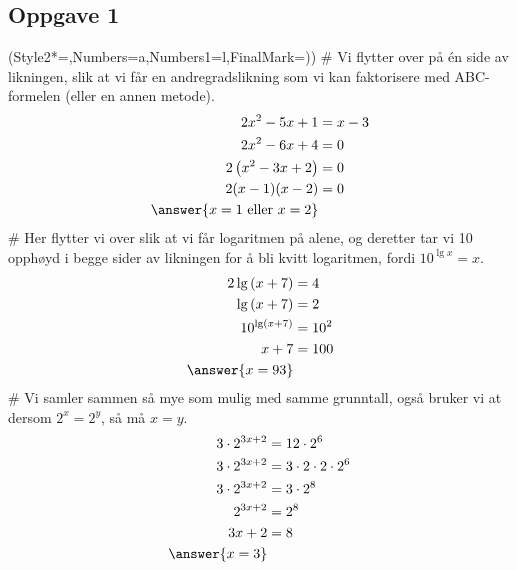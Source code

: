 \subsection*{Oppgave 1}
\begin{easylist}[enumerate]
\ListProperties(Style2*=,Numbers=a,Numbers1=l,FinalMark={)})
# Vi flytter over på én side av likningen, slik at vi får en andregradslikning som vi kan faktorisere med ABC-formelen (eller en annen metode).
\begin{align*}
	2x^2 - 5x + 1 &= x - 3 \\
	2x^2 - 6x + 4 &= 0 \\
	2 \left( x^2 - 3x + 2 \right) &= 0 \\
	2 (x-1)(x-2) &= 0 \\
	\answer{x = 1 \text{ eller } x = 2} &	
\end{align*}
# Her flytter vi over slik at vi får logaritmen på alene, og deretter tar vi 10 opphøyd i begge sider av likningen for å bli kvitt logaritmen, fordi $10^{\lg x} = x$.
\begin{align*}
	2 \lg \left(x + 7\right) &= 4 \\
	\lg \left(x + 7\right) &= 2 \\
	10^{\lg \left(x + 7\right)} &= 10^2 \\
	x + 7 &= 100 \\
	\answer{x = 93}
\end{align*}
# Vi samler sammen så mye som mulig med samme grunntall, også bruker vi at dersom $2^x = 2^y$, så må $x=y$.
\begin{align*}
	3 \cdot 2^{3x+ 2} &= 12 \cdot 2^6 \\
	3 \cdot 2^{3x+ 2} &= 3 \cdot 2 \cdot 2 \cdot 2^6 \\
	3 \cdot 2^{3x+ 2} &= 3 \cdot 2^8 \\
	 2^{3x+ 2} &= 2^8 \\
	  {3x+ 2} &= 8 \\
	  \answer{x = 3}
\end{align*}
\end{easylist}


